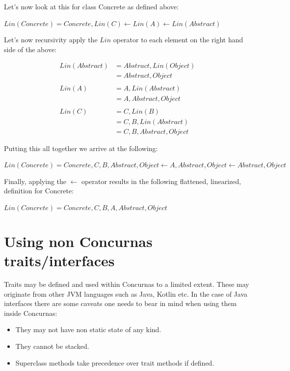 \documentclass[conc-doc]{subfiles}
\begin{document}
Let's now look at this for class Concrete as defined above:

\begin{center}
	$Lin(Concrete) = Concrete, Lin(C) \leftarrow Lin(A) \leftarrow Lin(Abstract)$
\end{center}

Let's now recursivity apply the $Lin$ operator to each element on the right hand side of the above:

\begin{center}
	\begin{align*}
		Lin(Abstract) &= Abstract, Lin(Object)\\
		&= Abstract, Object\\
		\\
		Lin(A) &= A, Lin(Abstract)\\
		&= A, Abstract, Object\\
		\\
		Lin(C) &= C, Lin(B)\\
		&= C, B, Lin(Abstract)\\
		&= C, B, Abstract, Object
	\end{align*}
\end{center}

Putting this all together we arrive at the following:

\begin{center}
	$Lin(Concrete) = Concrete, C, B, Abstract, Object \leftarrow A, Abstract, Object \leftarrow Abstract, Object$
\end{center}

Finally, applying the $\leftarrow$ operator results in the following flattened, linearized, definition for Concrete:

\begin{center}
	$Lin(Concrete) = Concrete, C, B, A, Abstract, Object$
\end{center}

\section{Using non Concurnas traits/interfaces}
Traits may be defined and used within Concurnas to a limited extent. These may originate from other JVM languages such as Java, Kotlin etc. In the case of Java interfaces there are some caveats one needs to bear in mind when using them inside Concurnas:
\begin{itemize}
	\item They may not have non static state of any kind.
	\item They cannot be stacked.
	\item Superclass methods take precedence over trait methods if defined.
\end{itemize}
\end{document}
